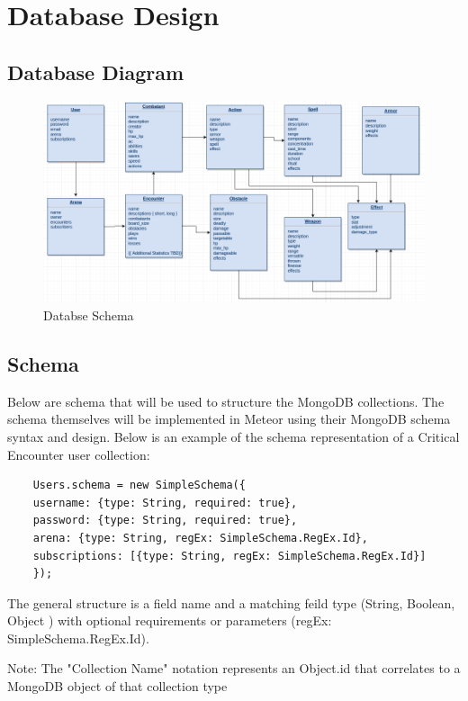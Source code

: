 \documentclass[12pt,a4paper]{report}
\begin{document}
	
	\newpage
	\section{Database Design}
	\subsection {Database Diagram}
	\begin{figure}[H]
		\centering
		\includegraphics[scale=.4]{database_schema}
		\caption{Databse Schema}
		\label{fig: Databse Schema }
	\end{figure}
	\subsection{Schema}
	Below are schema that will be used to structure the MongoDB collections. The schema themselves will be implemented in Meteor using their MongoDB schema syntax and design. Below is an example of the schema representation of a Critical Encounter user collection:
	
	\begin{lstlisting}
	Users.schema = new SimpleSchema({
	username: {type: String, required: true},
	password: {type: String, required: true},
	arena: {type: String, regEx: SimpleSchema.RegEx.Id},
	subscriptions: [{type: String, regEx: SimpleSchema.RegEx.Id}]
	});
	\end{lstlisting}
	
	The general structure is a field name and a matching feild type (String, Boolean, Object ) with optional requirements or parameters (regEx: SimpleSchema.RegEx.Id).
	
	Note: The { "Collection Name" } notation represents an Object.id that correlates to a MongoDB object of that collection type
\end{document}

